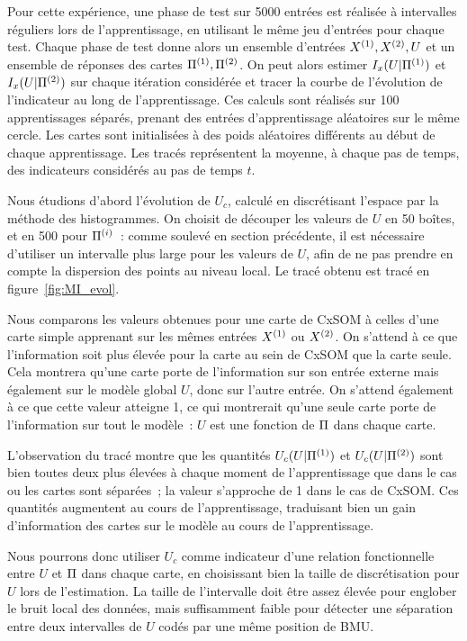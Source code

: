 \documentclass[../main]{subfiles}
\begin{document}
Pour cette expérience, une phase de test sur 5000 entrées est réalisée à intervalles réguliers lors de l'apprentissage, en utilisant le même jeu d'entrées pour chaque test. Chaque phase de test donne alors un ensemble d'entrées $X^{({1})}, X^{({2})}, U$ et un ensemble de réponses des cartes $\Pi^{({1})}, \Pi^{({2})}$. On peut alors estimer $I_x(U|\Pi^{({1})})$ et $I_x(U|\Pi^{({2})})$ sur chaque itération considérée et tracer la courbe de l'évolution de l'indicateur au long de l'apprentissage. 
Ces calculs sont réalisés sur 100 apprentissages séparés, prenant des entrées d'apprentissage aléatoires sur le même cercle. Les cartes sont initialisées à des poids aléatoires différents au début de chaque apprentissage. 
Les tracés représentent la moyenne, à chaque pas de temps, des indicateurs considérés au pas de temps $t$.

Nous étudions d'abord l'évolution de $U_c$, calculé en discrétisant l'espace par la méthode des histogrammes.
On choisit de découper les valeurs de $U$ en 50 boîtes, et en 500 pour $\Pi^{({i})}$~: comme soulevé en section précédente, il est nécessaire d'utiliser un intervalle plus large pour les valeurs de $U$, afin de ne pas prendre en compte la dispersion des points au niveau local.
Le tracé obtenu est tracé en figure~\ref{fig:MI_evol}.

Nous comparons les valeurs obtenues pour une carte de CxSOM à celles d'une carte simple apprenant sur les mêmes entrées $X^{({1})}$ ou $X^{({2})}$.
On s'attend à ce que l'information soit plus élevée pour la carte au sein de CxSOM que la carte seule. Cela montrera qu'une carte porte de l'information sur son entrée externe mais également sur le modèle global $U$, donc sur l'autre entrée.
On s'attend également à ce que cette valeur atteigne 1, ce qui montrerait qu'une seule carte porte de l'information sur tout le modèle~: $U$ est une fonction de $\Pi$ dans chaque carte.

L'observation du tracé montre que les quantités $U_c(U|\Pi^{({1})})$ et $U_c(U|\Pi^{({2})})$ sont bien toutes deux plus élevées à chaque moment de l'apprentissage que dans le cas ou les cartes sont séparées~; la valeur s'approche de 1 dans le cas de CxSOM.
Ces quantités augmentent au cours de l'apprentissage, traduisant bien un gain d'information des cartes sur le modèle au cours de l'apprentissage.

Nous pourrons donc utiliser $U_c$ comme indicateur d'une relation fonctionnelle entre $U$ et $\Pi$ dans chaque carte, en choisissant bien la taille de discrétisation pour $U$ lors de l'estimation. La taille de l'intervalle doit être assez élevée pour englober le bruit local des données, mais suffisamment faible pour détecter une séparation entre deux intervalles de $U$ codés par une même position de BMU.
\end{document}
